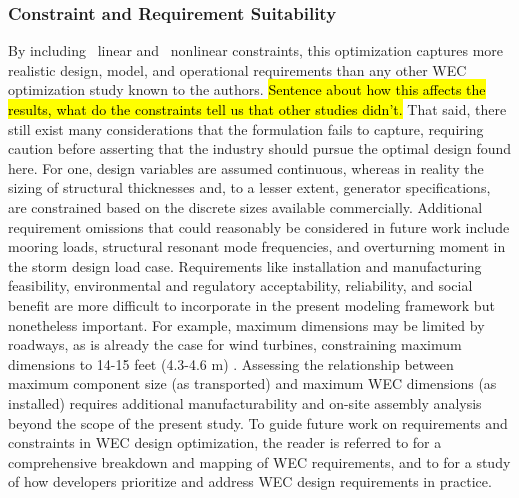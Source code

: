 \subsubsection{Constraint and Requirement Suitability}
By including \numLinConstraints~linear and \numNonlinConstraints~nonlinear constraints, this optimization captures more realistic design, model, and operational requirements than any other WEC optimization study known to the authors. \hl{Sentence about how this affects the results, what do the constraints tell us that other studies didn't.} That said, there still exist many considerations that the formulation fails to capture, requiring caution before asserting that the industry should pursue the optimal design found here. For one, design variables are assumed continuous, whereas in reality the sizing of structural thicknesses and, to a lesser extent, generator specifications, are constrained based on the discrete sizes available commercially. Additional requirement omissions that could reasonably be considered in future work include mooring loads, structural resonant mode frequencies, and overturning moment in the storm design load case. Requirements like installation and manufacturing feasibility, environmental and regulatory acceptability, reliability, and social benefit are more difficult to incorporate in the present modeling framework but nonetheless important. For example, maximum dimensions may be limited by roadways, as is already the case for wind turbines, constraining maximum dimensions to 14-15 feet (4.3-4.6 m) \cite{cotrell_analysis_2014}. Assessing the relationship between maximum component size (as transported) and maximum WEC dimensions (as installed) requires additional manufacturability and on-site assembly analysis beyond the scope of the present study. To guide future work on requirements and constraints in WEC design optimization, the reader is referred to \cite{bull_systems_2017,babarit_stakeholder_2017} for a comprehensive breakdown and mapping of WEC requirements, and to \cite{trueworthy_wave_2020} for a study of how developers prioritize and address WEC design requirements in practice.

